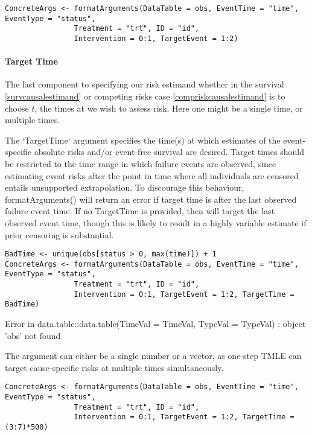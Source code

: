 \documentclass{report}
\newcommand{\1}{\ensuremath{\mathbf{1}}}
\begin{document}
\begin{lstlisting}
ConcreteArgs <- formatArguments(DataTable = obs, EventTime = "time", EventType = "status", 
				Treatment = "trt", ID = "id", 
				Intervention = 0:1, TargetEvent = 1:2)
\end{lstlisting}

\paragraph{Target Time}
\label{TargetTime}
The last component to specifying our risk estimand whether in the survival \eqref{survcausalestimand} or competing risks case \eqref{compriskcausalestimand} is to choose \(t\), the times at we wish to assess risk. Here one might be a single time, or multiple times.

The `TargetTime` argument specifies the time(s) at which estimates of the event-specific absolute risks and/or event-free survival are desired. Target times should be restricted to the time range in which failure events are observed, since estimating event risks after the point in time where all individuals are censored entails unsupported extrapolation. To discourage this behaviour, formatArguments() will return an error if target time is after the last observed failure event time. If no TargetTime is provided, then  will target the last observed event time, though this is likely to result in a highly variable estimate if prior censoring is substantial.

\begin{lstlisting}
BadTime <- unique(obs[status > 0, max(time)]) + 1
ConcreteArgs <- formatArguments(DataTable = obs, EventTime = "time", EventType = "status", 
				Treatment = "trt", ID = "id", 
				Intervention = 0:1, TargetEvent = 1:2, TargetTime = BadTime)
\end{lstlisting}

Error in data.table::data.table(TimeVal = TimeVal, TypeVal = TypeVal) : 
  object 'obs' not found

The  argument can either be a single number or a vector, as one-step TMLE can target cause-specific risks at multiple times simultaneously.

\begin{lstlisting}
ConcreteArgs <- formatArguments(DataTable = obs, EventTime = "time", EventType = "status", 
				Treatment = "trt", ID = "id", 
				Intervention = 0:1, TargetEvent = 1:2, TargetTime = (3:7)*500)
\end{lstlisting}
\end{document}
